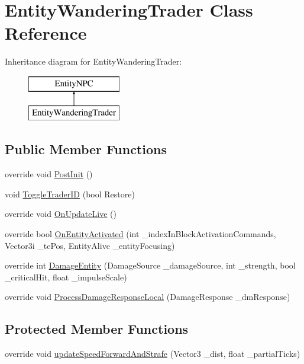 \hypertarget{class_entity_wandering_trader}{}\section{Entity\+Wandering\+Trader Class Reference}
\label{class_entity_wandering_trader}
Inheritance diagram for Entity\+Wandering\+Trader\+:\begin{figure}[H]
\begin{center}
\leavevmode
\includegraphics[height=2.000000cm]{dc/dac/class_entity_wandering_trader}
\end{center}
\end{figure}
\subsection*{Public Member Functions}
\begin{DoxyCompactItemize}
\item 
override void \mbox{\hyperlink{class_entity_wandering_trader_abd28fa0f0a2ef37396d0c9669c659da2}{Post\+Init}} ()
\item 
void \mbox{\hyperlink{class_entity_wandering_trader_a69dd924900c7fbd29d0d8d60eb3fef84}{Toggle\+Trader\+ID}} (bool Restore)
\item 
override void \mbox{\hyperlink{class_entity_wandering_trader_a7da11dfb0d8ca77baac19b566b157134}{On\+Update\+Live}} ()
\item 
override bool \mbox{\hyperlink{class_entity_wandering_trader_a33a263cf3022eefec249466a4cc2b9bc}{On\+Entity\+Activated}} (int \+\_\+index\+In\+Block\+Activation\+Commands, Vector3i \+\_\+te\+Pos, Entity\+Alive \+\_\+entity\+Focusing)
\item 
override int \mbox{\hyperlink{class_entity_wandering_trader_a6921d5c83ea2491820dbe7f168141e40}{Damage\+Entity}} (Damage\+Source \+\_\+damage\+Source, int \+\_\+strength, bool \+\_\+critical\+Hit, float \+\_\+impulse\+Scale)
\item 
override void \mbox{\hyperlink{class_entity_wandering_trader_a25f75b07bb3da64df34855c23225015d}{Process\+Damage\+Response\+Local}} (Damage\+Response \+\_\+dm\+Response)
\end{DoxyCompactItemize}
\subsection*{Protected Member Functions}
\begin{DoxyCompactItemize}
\item 
override void \mbox{\hyperlink{class_entity_wandering_trader_a52a62140eb8466285b6305988c51066e}{update\+Speed\+Forward\+And\+Strafe}} (Vector3 \+\_\+dist, float \+\_\+partial\+Ticks)
\end{DoxyCompactItemize}


